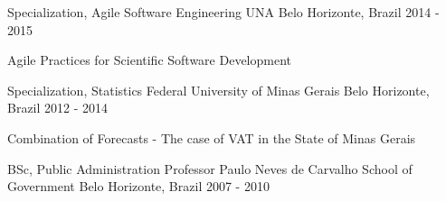 \begin{cventries}
  \cventry
    {Specialization, Agile Software Engineering}
    {UNA}
    {Belo Horizonte, Brazil}
    {2014 - 2015}
    {
      \begin{cvitems}
        \item {Agile Practices for Scientific Software Development}
      \end{cvitems}
    }
  \cventry
    {Specialization, Statistics}
    {Federal University of Minas Gerais}
    {Belo Horizonte, Brazil}
    {2012 - 2014}
    {
      \begin{cvitems}
        \item {Combination of Forecasts - The case of VAT in the State of Minas Gerais}
      \end{cvitems}
    }
  \cventry
    {BSc, Public Administration}
    {Professor Paulo Neves de Carvalho School of Government}
    {Belo Horizonte, Brazil}
    {2007 - 2010}
    {
      \begin{cvitems}
      \end{cvitems}
    }
\end{cventries}
